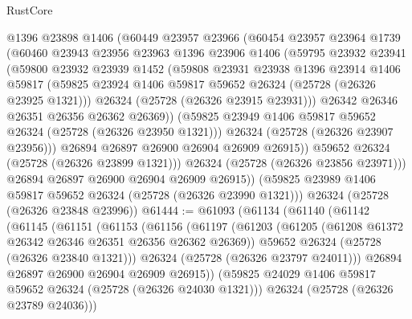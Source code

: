\begin{lexlean}{RustCore}
\begin{coremodule}
            @1396
            @23898
            @1406
            (@60449
              @23957
              @23966
              (@60454
                @23957
                @23964
                @1739
                (@60460
                  @23943
                  @23956
                  @23963
                  @1396
                  @23906
                  @1406
                  (@59795
                    @23932
                    @23941
                    (@59800
                      @23932
                      @23939
                      @1452
                      (@59808
                        @23931
                        @23938
                        @1396
                        @23914
                        @1406
                        @59817
                        (@59825 @23924 @1406 @59817 @59652 @26324 (@25728 (@26326 @23925 @1321)))
                        @26324
                        (@25728 (@26326 @23915 @23931)))
                      @26342
                      @26346
                      @26351
                      @26356
                      @26362
                      @26369))
                  (@59825 @23949 @1406 @59817 @59652 @26324 (@25728 (@26326 @23950 @1321)))
                  @26324
                  (@25728 (@26326 @23907 @23956)))
                @26894
                @26897
                @26900
                @26904
                @26909
                @26915))
            @59652
            @26324
            (@25728 (@26326 @23899 @1321)))
          @26324
          (@25728 (@26326 @23856 @23971)))
        @26894
        @26897
        @26900
        @26904
        @26909
        @26915))
    (@59825 @23989 @1406 @59817 @59652 @26324 (@25728 (@26326 @23990 @1321)))
    @26324
    (@25728 (@26326 @23848 @23996))
@61444 := @61093
    (@61134
      (@61140
        (@61142
          (@61145
            (@61151
              (@61153
                (@61156
                  (@61197
                    (@61203
                      (@61205 (@61208 @61372 @26342 @26346 @26351 @26356 @26362 @26369))
                      @59652
                      @26324
                      (@25728 (@26326 @23840 @1321)))
                    @26324
                    (@25728 (@26326 @23797 @24011)))
                  @26894
                  @26897
                  @26900
                  @26904
                  @26909
                  @26915))
              (@59825 @24029 @1406 @59817 @59652 @26324 (@25728 (@26326 @24030 @1321)))
              @26324
              (@25728 (@26326 @23789 @24036)))

\end{coremodule}
\end{lexlean}
